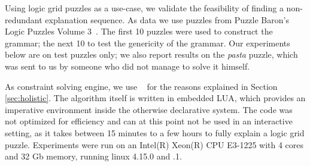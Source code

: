 Using logic grid puzzles as a use-case, we validate the feasibility of finding a non-redundant explanation sequence.
% 
As data we use puzzles from Puzzle Baron’s Logic Puzzles Volume 3~\cite{logigrammen}. The first 10 puzzles were used to construct the grammar; the next 10 to test the genericity of the grammar. 
Our experiments below are on test puzzles only; we also report results on the \textit{pasta} puzzle, which was sent to us by someone who did not manage to solve it himself.

As constraint solving engine, we use \idp~\cite{IDP} for the reasons explained in Section \ref{sec:holistic}. %
% 
The algorithm itself is written in embedded LUA, which provides an imperative environment inside the otherwise declarative \idp system. The code was not optimized for efficiency and can at this point not be used in an interactive setting, as it takes between 15 minutes to a few hours to fully explain a logic grid puzzle. Experiments were run on an Intel(R) Xeon(R) CPU E3-1225 with 4 cores and 32 Gb memory, running linux 4.15.0 and .1.

